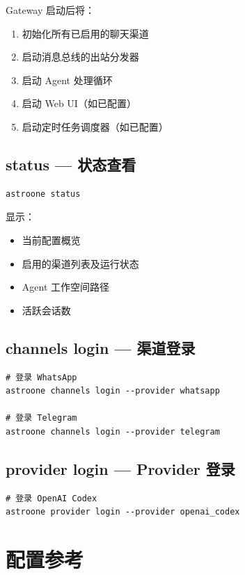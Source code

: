 \documentclass[12pt,a4paper,UTF8]{ctexart}
\begin{document}
Gateway 启动后将：
\begin{enumerate}
    \item 初始化所有已启用的聊天渠道
    \item 启动消息总线的出站分发器
    \item 启动 Agent 处理循环
    \item 启动 Web UI（如已配置）
    \item 启动定时任务调度器（如已配置）
\end{enumerate}

\section{status — 状态查看}

\begin{verbatim}
astroone status
\end{verbatim}

显示：
\begin{itemize}
    \item 当前配置概览
    \item 启用的渠道列表及运行状态
    \item Agent 工作空间路径
    \item 活跃会话数
\end{itemize}

\section{channels login — 渠道登录}

\begin{verbatim}
# 登录 WhatsApp
astroone channels login --provider whatsapp

# 登录 Telegram
astroone channels login --provider telegram
\end{verbatim}

\section{provider login — Provider 登录}

\begin{verbatim}
# 登录 OpenAI Codex
astroone provider login --provider openai_codex
\end{verbatim}

\chapter{配置参考}
\end{document}
